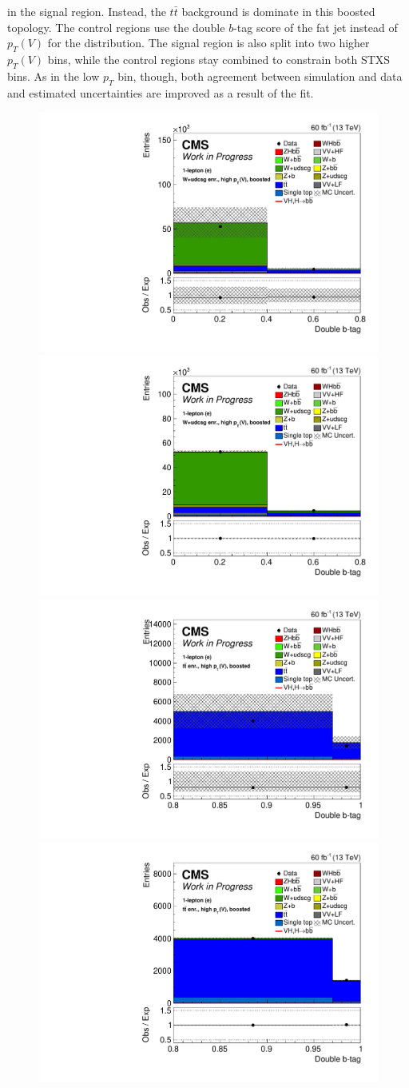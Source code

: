 in the signal region.
Instead, the $t\bar{t}$ background is dominate in this boosted
topology. 
The control regions use the double $b$-tag score of the fat jet instead of $p_T(V)$ for the distribution.
The signal region is also split into two higher $p_T(V)$ bins, while the control regions stay combined
to constrain both STXS bins.
As in the low $p_T$ bin, though, both agreement between simulation and data and estimated uncertainties
are improved as a result of the fit.
%
\begin{figure}
  \centering
  \includegraphics[width=0.35\linewidth]{figures/210323_STXS_VZ_unblinded_XbbVZ_8fe9e9cd_postfitplots/plot_shapes_vhbb_Wen_18_13TeV2018_prefit}
  \includegraphics[width=0.35\linewidth]{figures/210323_STXS_VZ_unblinded_XbbVZ_8fe9e9cd_postfitplots/plot_shapes_vhbb_Wen_18_13TeV2018_postfit} \\
  \includegraphics[width=0.35\linewidth]{figures/210323_STXS_VZ_unblinded_XbbVZ_8fe9e9cd_postfitplots/plot_shapes_vhbb_Wen_20_13TeV2018_prefit}
  \includegraphics[width=0.35\linewidth]{figures/210323_STXS_VZ_unblinded_XbbVZ_8fe9e9cd_postfitplots/plot_shapes_vhbb_Wen_20_13TeV2018_postfit} \\

\end{figure}
